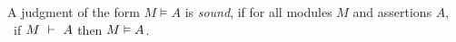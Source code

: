 \begin{definition}
\label{ax:specW-prove-soundness}
A judgment of the form $M \vDash A$ is \emph{sound}, if for all
 modules $M$ and assertions $A$, \ if $M\ \vdash\ A$ then $M \vDash A$.
\end{definition}

%
%
%
